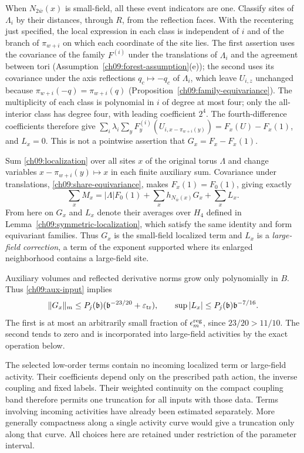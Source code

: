When $N_{2\bar w}(x)$ is small-field, all these event indicators are one.
Classify sites of $\Lambda_i$ by their distances, through $R$,
from the reflection faces. With the recentering just specified,
the local expression in each class is independent of $i$ and of the branch of $\pi_{w+i}$ on which each coordinate of the site lies. The first assertion uses the covariance of the family $F^{(i)}$ under the translations of $\Lambda_i$ and the agreement between tori (Assumption~\ref{ch09:forest-assumption}(e)); the second uses its covariance under the axis reflections $q_c\mapsto-q_c$ of $\Lambda_i$, which leave $U_{i,z}$ unchanged because $\pi_{w+i}(-q)=\pi_{w+i}(q)$ (Proposition~\ref{ch09:family-equivariance}).
The multiplicity of each class is polynomial in $i$ of
degree at most four; only the all-interior class has degree
four, with leading coefficient $2^4$.
The fourth-difference coefficients therefore give
$\sum_i\lambda_i\sum_y F_y^{(i)}(U_{i,x-\pi_{w+i}(y)})
=F_x(U)-F_x(1)$, and $L_x=0$.
This is not a pointwise assertion that $G_x=F_x-F_x(1)$.

Sum \eqref{ch09:localization} over all sites $x$ of the original torus
$\Lambda$ and change variables
$x-\pi_{w+i}(y)\mapsto x$ in each finite auxiliary sum.
Covariance under translations, \eqref{ch09:share-equivariance}, makes $F_x(1)=F_0(1)$, giving exactly
\[
 \sum_x M_x=|\Lambda|F_0(1)+
              \sum_x h_{N_{\bar w}(x)}G_x+\sum_xL_x .
\]
From here on $G_x$ and $L_x$ denote their averages over $H_4$ defined in Lemma~\ref{ch09:symmetric-localization}, which satisfy the same identity and form equivariant families. Thus $G_x$ is the small-field localized term and $L_x$ is a
\emph{large-field correction}, a term of the exponent supported where its enlarged
neighborhood contains a large-field site.

Auxiliary volumes and reflected derivative norms grow only
polynomially in $B$. Thus \eqref{ch09:aux-input} implies
\[
 \|G_x\|_m\le P_j(\mathfrak b)
           (\mathfrak b^{-23/20}+\varepsilon_{\rm tr}),
 \qquad \sup|L_x|\le P_j(\mathfrak b)\mathfrak b^{-7/16}.
\]
The first is at most an arbitrarily small fraction of
$\epsilon_m^{\rm reg}$, since $23/20>11/10$.
The second tends to zero and is incorporated into
large-field activities by the exact operation below.

The selected low-order terms contain no incoming localized term or
large-field activity. Their coefficients depend only on the
prescribed path action, the inverse coupling and fixed labels. Their
weighted continuity on the compact coupling band therefore
permits one truncation for all inputs with those data.
Terms involving incoming activities have already been
estimated separately. More generally compactness along a
single activity curve would give a truncation only along
that curve. All choices here are retained under restriction
of the parameter interval.

